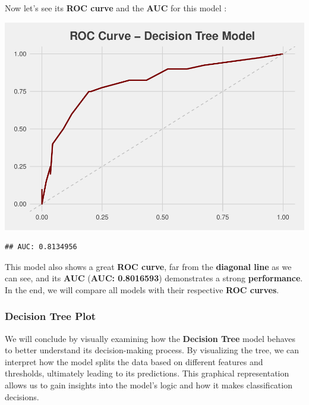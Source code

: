 \documentclass[
]{article}
\begin{document}
Now let's see its \textbf{ROC curve} and the \textbf{AUC} for this model
:

\begin{center}\includegraphics{Diabetes-Project_files/figure-latex/deciison tree roc and auc-1} \end{center}

\begin{verbatim}
## AUC: 0.8134956
\end{verbatim}

This model also shows a great \textbf{ROC curve}, far from the
\textbf{diagonal line} as we can see, and its \textbf{AUC} (\textbf{AUC:
0.8016593}) demonstrates a strong \textbf{performance}. In the end, we
will compare all models with their respective \textbf{ROC curves}.

\newpage

\subsubsection{Decision Tree Plot}\label{decision-tree-plot}

We will conclude by visually examining how the \textbf{Decision Tree}
model behaves to better understand its decision-making process. By
visualizing the tree, we can interpret how the model splits the data
based on different features and thresholds, ultimately leading to its
predictions. This graphical representation allows us to gain insights
into the model's logic and how it makes classification decisions.
\end{document}
